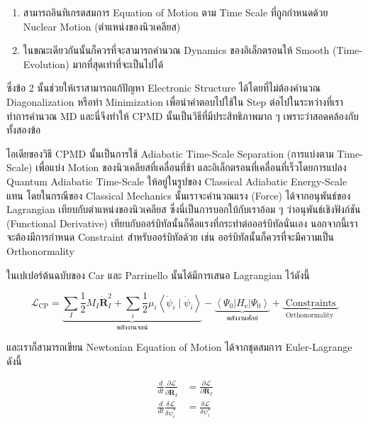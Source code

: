 \begin{enumerate}[topsep=0pt,noitemsep]
  \setlength\itemsep{0.5em}
  \item สามารถอินทิเกรตสมการ Equation of Motion ตาม Time Scale ที่ถูกกำหนดด้วย Nuclear Motion (ตำแหน่งของนิวเคลียส)

  \item ในขณะเดียวกันนั้นก็ควรที่จะสามารถคำนวณ Dynamics ของอิเล็กตรอนให้ Smooth (Time-Evolution) มากที่สุดเท่าที่จะเป็นไปได้
\end{enumerate}

\noindent ซึ่งข้อ 2 นั้นช่วยให้เราสามารถแก้ปัญหา Electronic Structure ได้โดยที่ไม่ต้องคำนวณ Diagonalization หรือทำ Minimization
เพื่อนำคำตอบไปใช้ใน Step ต่อไปในระหว่างที่เราทำการคำนวณ MD และนี่จึงทำให้ CPMD นั้นเป็นวิธีที่มีประสิทธิภาพมาก ๆ เพราะว่าสอดคล้องกับทั้งสองข้อ

ไอเดียของวิธี CPMD นั้นเป็นการใช้ Adiabatic Time-Scale Separation (การแบ่งตาม Time-Scale) เพื่อแบ่ง Motion ของนิวเคลียสที่เคลื่อนที่ช้า
และอิเล็กตรอนที่เคลื่อนที่เร็วโดยการแปลง Quantum Adiabatic Time-Scale ให้อยู่ในรูปของ Classical Adiabatic Energy-Scale แทน
โดยในกรณีของ Classical Mechanics นั้นเราจะคำนวณแรง (Force) ได้จากอนุพันธ์ของ Lagrangian เทียบกับตำแหน่งของนิวเคลียส
ซึ่งนี่เป็นการบอกใบ้กับเราอ้อม ๆ ว่าอนุพันธ์เชิงฟังก์ชัน (Functional Derivative) เทียบกับออร์บิทัลนั้นก็คือแรงที่กระทำต่อออร์บิทัลนั่นเอง
นอกจากนี้เราจะต้องมีการกำหนด Constraint สำหรับออร์บิทัลด้วย เช่น ออร์บิทัลนั้นก็ควรที่จะมีความเป็น Orthonormality

ในเปเปอร์ต้นฉบับของ Car และ Parrinello นั้นได้มีการเสนอ Lagrangian ไว้ดังนี้

\begin{equation}
  \mathcal{L}_{\mathrm{CP}}
  =
  \underbrace{\sum_I \frac{1}{2} M_I \dot{\mathbf{R}}_I^2
    +\sum_i \frac{1}{2} \mu_i\left\langle\dot{\psi}_i \mid \dot{\psi}_i\right\rangle}_{\text{พลังงานจลน์}}
  -\underbrace{\left\langle\Psi_0\left| H_{\mathrm{e}}\right| \Psi_0\right\rangle}_{\text{พลังงานศักย์}}
  +\underbrace{\text{ Constraints }}_{\text{Orthonormality }}
\end{equation}

\noindent และเราก็สามารถเขียน Newtonian Equation of Motion ได้จากชุดสมการ Euler-Lagrange ดังนี้


\begin{align}
  \frac{d}{d t} \frac{\partial \mathcal{L}}{\partial \dot{\mathbf{R}}_I}
   & =
  \frac{\partial \mathcal{L}}{\partial \mathbf{R}_I} \\
  \frac{d}{d t} \frac{\delta \mathcal{L}}{\delta \dot{\psi}_i^{\star}}
   & =
  \frac{\delta \mathcal{L}}{\delta \psi_i^{\star}}
\end{align}

